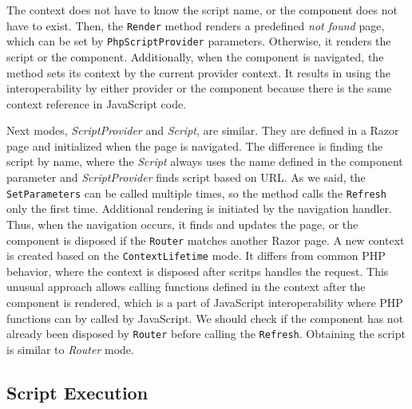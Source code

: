 The context does not have to know the script name, or the component does not have to exist. 
Then, the \texttt{Render} method renders a predefined \textit{not found} page, which can be set by \texttt{PhpScriptProvider} parameters.
Otherwise, it renders the script or the component.
Additionally, when the component is navigated, the method sets its context by the current provider context.
It results in using the interoperability by either provider or the component because there is the same context reference in JavaScript code.
\par
Next modes, \textit{ScriptProvider} and \textit{Script}, are similar.
They are defined in a Razor page and initialized when the page is navigated.  
The difference is finding the script by name, where the \textit{Script} always uses the name defined in the component parameter and \textit{ScriptProvider} finds script based on URL.
As we said, the \texttt{SetParameters} can be called multiple times, so the method calls the \texttt{Refresh} only the first time.
Additional rendering is initiated by the navigation handler.
Thus, when the navigation occurs, it finds and updates the page, or the component is disposed if the \texttt{Router} matches another Razor page.
A new context is created based on the \texttt{ContextLifetime} mode.
It differs from common PHP behavior, where the context is disposed after scritps handles the request.
This unusual approach allows calling functions defined in the context after the component is rendered, which is a part of JavaScript interoperability where PHP functions can by called by JavaScript.
We should check if the component has not already been disposed by \texttt{Router} before calling the \texttt{Refresh}.
Obtaining the script is similar to \textit{Router} mode.

\subsection{Script Execution}

